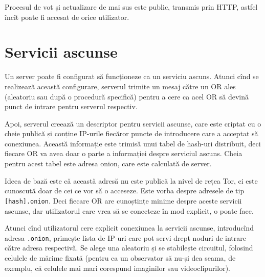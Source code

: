 Procesul de vot și actualizare de mai sus este public, transmis prin HTTP, astfel
încît poate fi accesat de orice utilizator.



\section{Servicii ascunse}

\indent\indent Un server poate fi configurat să funcționeze ca un serviciu
ascuns. Atunci cînd se realizează această configurare, serverul trimite
un mesaj către un OR ales (aleatoriu sau după o procedură specifică) pentru
a cere ca acel OR să devină punct de intrare pentru serverul respectiv.

Apoi, serverul creează un descriptor pentru servicii ascunse, care este
criptat cu o cheie publică și conține IP-urile fiecăror puncte de introducere
care a acceptat să conexiunea. Această informație este trimisă unui tabel
de hash-uri distribuit, deci fiecare OR va avea doar o parte a informației
despre serviciul ascuns. Cheia pentru acest tabel este adresa onion, care
este calculată de server.

Ideea de bază este că această adresă nu este publică la nivel de rețea Tor,
ci este cunoscută doar de cei ce vor să o acceseze. Este vorba despre
adresele de tip \texttt{[hash].onion}. Deci fiecare OR are cunoștințe minime
despre aceste servicii ascunse, dar utilizatorul care vrea să se conecteze
în mod explicit, o poate face.

Atunci cînd utilizatorul cere explicit conexiunea la servicii ascunse,
introducînd adresa \texttt{.onion}, primește lista de IP-uri care pot servi
drept noduri de intrare către adresa respectivă. Se alege una aleatoriu
și se stabilește circuitul, folosind celulele de mărime fixată (pentru ca
un observator să nu-și dea seama, de exemplu, că celulele mai mari corespund
imaginilor sau videoclipurilor).

